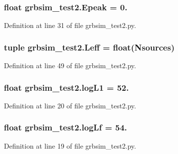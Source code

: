 \hypertarget{namespacegrbsim__test2_a3319df3701f2ee98f3ee0f0a9321a6c6}{
\subsubsection[{Epeak}]{\setlength{\rightskip}{0pt plus 5cm}float grbsim\-\_\-test2.\-Epeak = 0.}}\label{namespacegrbsim__test2_a3319df3701f2ee98f3ee0f0a9321a6c6}


Definition at line 31 of file grbsim\-\_\-test2.\-py.

\hypertarget{namespacegrbsim__test2_afc8457721a0b6d9402e404fafada2acb}{
\subsubsection[{Leff}]{\setlength{\rightskip}{0pt plus 5cm}tuple grbsim\-\_\-test2.\-Leff = float({\bf Nsources})}}\label{namespacegrbsim__test2_afc8457721a0b6d9402e404fafada2acb}


Definition at line 49 of file grbsim\-\_\-test2.\-py.

\hypertarget{namespacegrbsim__test2_a75a20cb404a9721434baa76ac3268d29}{
\subsubsection[{log\-L1}]{\setlength{\rightskip}{0pt plus 5cm}float grbsim\-\_\-test2.\-log\-L1 = 52.}}\label{namespacegrbsim__test2_a75a20cb404a9721434baa76ac3268d29}


Definition at line 20 of file grbsim\-\_\-test2.\-py.

\hypertarget{namespacegrbsim__test2_a519b592ed1ecd659e6798c090fff6322}{
\subsubsection[{log\-Lf}]{\setlength{\rightskip}{0pt plus 5cm}float grbsim\-\_\-test2.\-log\-Lf = 54.}}\label{namespacegrbsim__test2_a519b592ed1ecd659e6798c090fff6322}


Definition at line 19 of file grbsim\-\_\-test2.\-py.

